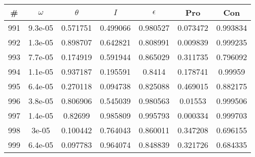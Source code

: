 \newpage
\begin{table}
\begin{tabular}{c|c|c|c|c|c|c}
\# & $\omega$ & $\theta$ & $I$ & $\epsilon$ & Pro & Con\\
\hline
991 & 9.3e-05 & 0.571751 & 0.499066 & 0.980527 & 0.073472 & 0.993834\\
992 & 1.3e-05 & 0.898707 & 0.642821 & 0.808991 & 0.009839 & 0.999235\\
993 & 7.7e-05 & 0.174919 & 0.591944 & 0.865029 & 0.311735 & 0.796092\\
994 & 1.1e-05 & 0.937187 & 0.195591 & 0.8414 & 0.178741 & 0.99959\\
995 & 6.4e-05 & 0.270118 & 0.094738 & 0.825088 & 0.469015 & 0.882175\\
996 & 3.8e-05 & 0.806906 & 0.545039 & 0.980563 & 0.01553 & 0.999506\\
997 & 1.4e-05 & 0.82699 & 0.985809 & 0.995793 & 0.000334 & 0.999703\\
998 & 3e-05 & 0.100442 & 0.764043 & 0.860011 & 0.347208 & 0.696155\\
999 & 6.4e-05 & 0.097783 & 0.964074 & 0.848839 & 0.321726 & 0.684335\\
\end{tabular}
\end{table}